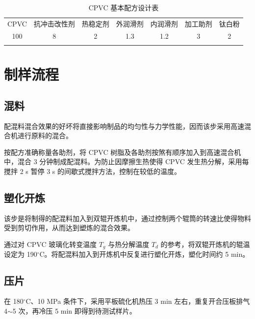 \documentclass[a4paper, oneside, onecolumn, 12pt]{ctexrep}    %
\newcommand{\cd}{$^{\circ}$C}  %
\begin{document}
\begin{table}[htbp]
    \caption{CPVC 基本配方设计表}
    \label{tab2}
    \begin{center}
    \footnotesize{
        \begin{tabular}{ccccccc}
            \Xhline{1pt}
            CPVC & 抗冲击改性剂 & 热稳定剂\footnotemark[1] & 外润滑剂\footnotemark[2] & 内润滑剂\footnotemark[3] & 加工助剂 & 钛白粉 \\
            \Xhline{0.5pt}
            100\footnotemark[4] & 8 & 2 & 1.3 & 1.2 & 3 & 2   \\
            \Xhline{1pt}
        \end{tabular}
    }
    \end{center}
\end{table}

\section{制样流程}

\subsection{混料}
配混料混合效果的好坏将直接影响制品的均匀性与力学性能，因而该步采用高速混合机进行原料的混合。\par
按配方准确称量各助剂，将 CPVC 树脂及各助剂按煞有顺序加入到高速混合机中，混合 3 分钟制成配混料。为防止因摩擦生热使得 CPVC 发生热分解，采用每搅拌 2 s 暂停 3 s 的间歇式搅拌方法，控制在较低的温度。

\subsection{塑化开炼}
该步是将制得的配混料加入到双辊开炼机中，通过控制两个辊筒的转速比使得物料受到剪切作用，从而达到塑炼的混合效果。\par
通过对 CPVC 玻璃化转变温度 $T_g$ 与热分解温度 $T_d$ 的参考，将双辊开炼机的辊温设定为 190\cd。将配混料加入到开炼机中反复进行塑化开炼，塑化时间约 5 min。

\subsection{压片}
在 180\cd、10 MPa 条件下，采用平板硫化机热压 3 min 左右，重复开合压板排气 4$\sim$5 次，再冷压 5 min 即得到待测试样片。
\end{document}
